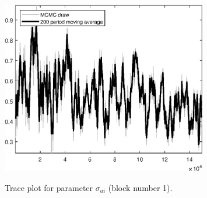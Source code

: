 \begin{figure}[H]
\centering
  \includegraphics[width=0.8\textwidth]{BRS_sectoral_KK/graphs/TracePlot_sigma_ai_blck_1}\\
    \caption{Trace plot for parameter ${\sigma_{ai}}$ (block number 1).}
\end{figure}
